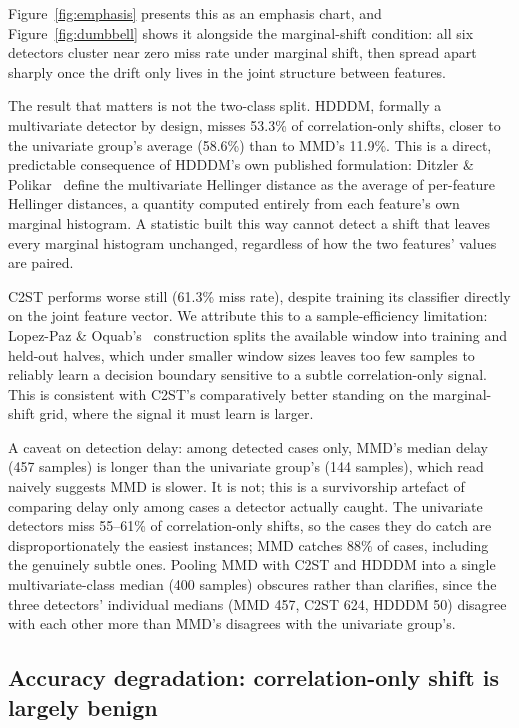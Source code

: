 \documentclass[conference]{IEEEtran}
\begin{document}
Figure~\ref{fig:emphasis} presents this as an emphasis chart, and Figure~\ref{fig:dumbbell} shows it alongside the marginal-shift condition: all six detectors cluster near zero miss rate under marginal shift, then spread apart sharply once the drift only lives in the joint structure between features.

The result that matters is not the two-class split. HDDDM, formally a multivariate detector by design, misses 53.3\% of correlation-only shifts, closer to the univariate group's average (58.6\%) than to MMD's 11.9\%. This is a direct, predictable consequence of HDDDM's own published formulation: Ditzler \& Polikar~\cite{ditzler2011} define the multivariate Hellinger distance as the average of per-feature Hellinger distances, a quantity computed entirely from each feature's own marginal histogram. A statistic built this way cannot detect a shift that leaves every marginal histogram unchanged, regardless of how the two features' values are paired.

C2ST performs worse still (61.3\% miss rate), despite training its classifier directly on the joint feature vector. We attribute this to a sample-efficiency limitation: Lopez-Paz \& Oquab's~\cite{lopezpaz2017} construction splits the available window into training and held-out halves, which under smaller window sizes leaves too few samples to reliably learn a decision boundary sensitive to a subtle correlation-only signal. This is consistent with C2ST's comparatively better standing on the marginal-shift grid, where the signal it must learn is larger.

A caveat on detection delay: among detected cases only, MMD's median delay (457 samples) is longer than the univariate group's (144 samples), which read naively suggests MMD is slower. It is not; this is a survivorship artefact of comparing delay only among cases a detector actually caught. The univariate detectors miss 55--61\% of correlation-only shifts, so the cases they do catch are disproportionately the easiest instances; MMD catches 88\% of cases, including the genuinely subtle ones. Pooling MMD with C2ST and HDDDM into a single multivariate-class median (400 samples) obscures rather than clarifies, since the three detectors' individual medians (MMD 457, C2ST 624, HDDDM 50) disagree with each other more than MMD's disagrees with the univariate group's.

\subsection{Accuracy degradation: correlation-only shift is largely benign}
\end{document}
